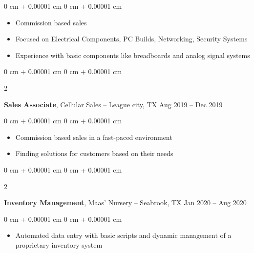 \documentclass[10pt, letterpaper]{article}
\newenvironment{highlights}{
    \begin{itemize}[
        topsep=0.10 cm,
        parsep=0.10 cm,
        partopsep=0pt,
        itemsep=0pt,
        leftmargin=0 cm + 10pt
    ]
}{
    \end{itemize}
} %
\newenvironment{onecolentry}{
    \begin{adjustwidth}{
        0 cm + 0.00001 cm
    }{
        0 cm + 0.00001 cm
    }
}{
    \end{adjustwidth}
} %
\newenvironment{twocolentry}[2][]{
    \onecolentry
    \def\secondColumn{#2}
    \setcolumnwidth{\fill, 4.5 cm}
    \begin{paracol}{2}
}{
    \switchcolumn \raggedleft \secondColumn
    \end{paracol}
    \endonecolentry
} %
\begin{document}
        \vspace{0.10 cm}
        \begin{onecolentry}
            \begin{highlights}
                \item Commission based sales
                \item Focused on Electrical Components, PC Builds, Networking, Security Systems
                \item Experience with basic components like breadboards and analog signal systems
            \end{highlights}
        \end{onecolentry}


        \vspace{0.2 cm}

        \begin{twocolentry}{
            Aug 2019 – Dec 2019
        }
            \textbf{Sales Associate}, Cellular Sales -- League city, TX\end{twocolentry}

        \vspace{0.10 cm}
        \begin{onecolentry}
            \begin{highlights}
                \item Commission based sales in a fast-paced environment
                \item Finding solutions for customers based on their needs
            \end{highlights}
        \end{onecolentry}


 \vspace{0.2 cm}

        \begin{twocolentry}{
            Jan 2020 – Aug 2020
        }
            \textbf{Inventory Management}, Maas' Nursery -- Seabrook, TX\end{twocolentry}

        \vspace{0.10 cm}
        \begin{onecolentry}
            \begin{highlights}
                \item Automated data entry with basic scripts and dynamic management of a proprietary inventory system
            \end{highlights}
        \end{onecolentry}
\end{document}
